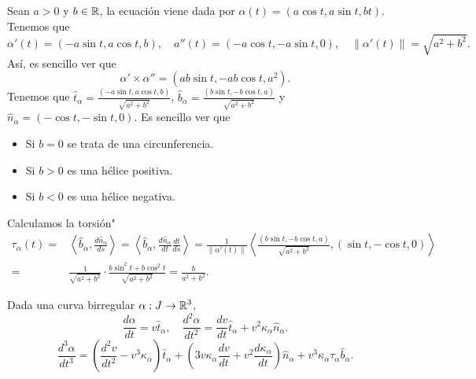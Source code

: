 \begin{eg}
Sean $\displaystyle a > 0 $ y $\displaystyle b \in \mathbb{R} $, la ecuación viene dada por $\displaystyle \alpha\left(t\right)=\left(a\cos t, a \sin t, bt\right) $. 
Tenemos que 
\[\alpha'\left(t\right)=\left(-a \sin t, a \cos t, b\right), \quad a''\left(t\right)=\left(-a \cos t, - a \sin t, 0\right), \quad \|\alpha'\left(t\right)\|=\sqrt{a^{2} + b^{2}} .\]
Así, es sencillo ver que 
\[\alpha' \times \alpha'' = \left(ab \sin t, - ab \cos t , a^{2}\right) .\]
Tenemos que $\displaystyle \hat{t}_{\alpha }=\frac{\left(-a \sin t, a \cos t, b\right)}{\sqrt{a^{2} + b^{2}}} $, $\displaystyle \hat{b}_{\alpha }=\frac{\left(b\sin t, - b \cos t, a\right)}{\sqrt{a^{2} + b^{2}}} $ y $\displaystyle \hat{n}_{\alpha }=\left(-\cos t, - \sin t, 0\right) $. Es sencillo ver que
\begin{itemize}
\item Si $\displaystyle b = 0 $ se trata de una circunferencia.
\item Si $\displaystyle b > 0 $ es una hélice positiva.
\item Si $\displaystyle b < 0 $ es una hélice negativa.
\end{itemize}
Calculamos la torsión" 
\[
\begin{split}
	\tau_{\alpha }\left(t\right)= & \left\langle \hat{b}_{\alpha }, \frac{d\hat{n}_{\alpha }}{d s} \right\rangle = \left\langle \hat{b}_{\alpha }, \frac{d\hat{n}_{\alpha }}{dt}\frac{dt}{d s} \right\rangle = \frac{1}{\|\alpha'\left(t\right)\|} \left\langle \frac{\left(b\sin t, - b\cos t, a\right)}{\sqrt{a^{2}+b^{2}}}, \left(\sin t, -\cos t, 0\right) \right\rangle \\
	= & \frac{1}{\sqrt{a^{2}+b^{2}}} \cdot \frac{b\sin ^{2}t + b \cos ^{2}t}{\sqrt{a^{2}+b^{2}}} = \frac{b}{a^{2}+b^{2}}.
\end{split}
\]
\end{eg}
\begin{prop}
Dada una curva birregular $\displaystyle \alpha : J \to \mathbb{R}^{3} $, 
\[\frac{d\alpha }{d t}= v\hat{t}_{\alpha }, \quad \frac{d^{2}\alpha }{dt ^{2}}=\frac{dv}{dt}\hat{t}_{\alpha } + v^{2}\kappa_{\alpha }\hat{n}_{\alpha } .\]
\[\frac{d^{3}\alpha }{dt ^{3}}=\left(\frac{d^{2}v}{dt ^{2}}-v^{3}\kappa_{\alpha }\right)\hat{t}_{\alpha } + \left(3 v\kappa_{\alpha }\frac{dv}{dt} + v^{2}\frac{d\kappa_{\alpha }}{dt}\right)\hat{n}_{\alpha }+v^{3}\kappa_{\alpha }\tau_{\alpha }\hat{b}_{\alpha } .\]
\end{prop}
